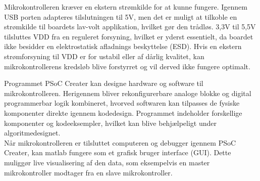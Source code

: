 Mikrokontrolleren kræver en ekstern strømkilde for at kunne fungere. Igennem USB porten adapteres tilslutningen til 5V, men det er muligt at tilkoble en strømkilde til boardets lav-volt applikation, hvilket gør den trådløs. 3,3V til 5,5V tilsluttes VDD fra en reguleret forsyning, hvilket er yderst essentielt, da boardet ikke besidder en elektrostatisk afladnings beskyttelse (ESD). Hvis en ekstern strømforsyning til VDD er for ustabil eller af dårlig kvalitet, kan mikrokontrollerens kredsløb blive forstyrret og vil derved ikke fungere optimalt. \citep{Semiconductor2016}

Programmet PSoC Creater kan designe hardware og software til mikrokontrolleren. Herigennem bliver rekonfigurerbare analoge blokke og digital programmerbar logik kombineret, hvorved softwaren kan tilpasses de fysiske komponenter direkte igennem kodedesign. Programmet indeholder forskellige komponenter og kodeeksempler, hvilket kan blive behjælpeligt under algoritmedesignet. \citep{Semiconductor2016} \\
Når mikrokontrolleren er tilsluttet computeren og debugger igennem PSoC Creater, kan matlab fungere som et grafisk bruger interface (GUI). Dette muliggør live visualisering af den data, som eksempelvis en master mikrokontroller modtager fra en slave mikrokontroller.

